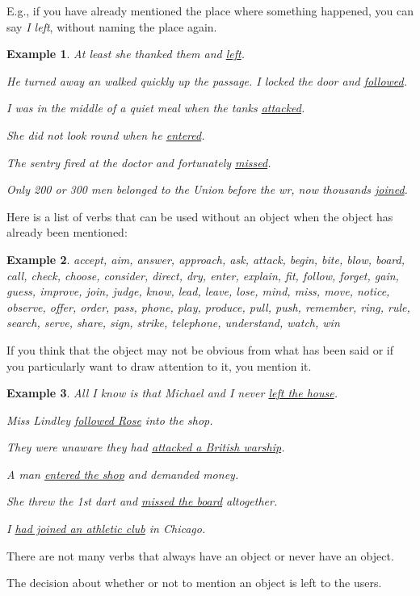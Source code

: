 \documentclass[oneside]{book}
\numberwithin{equation}{section}
\newtheorem{example}{Example}[section]
\begin{document}
E.g., if you have already mentioned the place where something happened, you can say \textit{I left}, without naming the place again.
\begin{example}
    At least she thanked them and \underline{left}.
    
    He turned away an walked quickly up the passage. I locked the door and \underline{followed}.
    
    I was in the middle of a quiet meal when the tanks \underline{attacked}.
    
    She did not look round when he \underline{entered}.
    
    The sentry fired at the doctor and fortunately \underline{missed}.
    
    Only 200 or 300 men belonged to the Union before the wr, now thousands \underline{joined}.
\end{example}
%
\noindent{} Here is a list of verbs that can be used without an object when the object has already been mentioned:
\begin{example}
    accept, aim, answer, approach, ask, attack, begin, bite, blow, board, call, check, choose, consider, direct, dry, enter, explain, fit, follow, forget, gain, guess, improve, join, judge, know, lead, leave, lose, mind, miss, move, notice, observe, offer, order, pass, phone, play, produce, pull, push, remember, ring, rule, search, serve, share, sign, strike, telephone, understand, watch, win
\end{example}
%
\noindent{} If you think that the object may not be obvious from what has been said or if you particularly want to draw attention to it, you mention it.
\begin{example}
    All I know is that Michael and I never \underline{left the house}.
    
    Miss Lindley \underline{followed Rose} into the shop.
    
    They were unaware they had \underline{attacked a British warship}.
    
    A man \underline{entered the shop} and demanded money.
    
    She threw the 1st dart and \underline{missed the board} altogether.
    
    I \underline{had joined an athletic club} in Chicago.
\end{example}
%
\noindent{} There are not many verbs that always have an object or never have an object.

The decision about whether or not to mention an object is left to the users.
\end{document}

